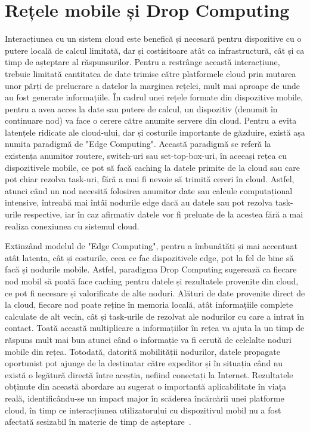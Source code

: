 \documentclass[12pt,a4paper]{report}
\begin{document}
\section{Rețele mobile și Drop Computing}
Interacțiunea cu un sistem cloud este benefică și necesară pentru dispozitive cu o putere locală de calcul limitată, dar și costisitoare atât ca infrastructură, cât și ca timp de așteptare al răspunsurilor. Pentru a restrânge această interacțiune, trebuie limitată cantitatea de date trimise către platformele cloud prin mutarea unor părți de prelucrare a datelor la marginea rețelei, mult mai aproape de unde au fost generate informațiile. În cadrul unei rețele formate din dispozitive mobile, pentru a avea acces la date sau putere de calcul, un dispozitiv (denumit în continuare nod) va face o cerere către anumite servere din cloud. Pentru a evita latențele ridicate ale cloud-ului, dar și costurile importante de găzduire, există așa numita paradigmă de "Edge Computing". Această paradigmă se referă la existența anumitor routere, switch-uri sau set-top-box-uri, în aceeași rețea cu dispozitivele mobile, ce pot să facă caching la datele primite de la cloud sau care pot chiar rezolva task-uri, fără a mai fi nevoie să trimită cereri în cloud. Astfel, atunci când un nod necesită folosirea anumitor date sau calcule computațional intensive, întreabă mai întâi nodurile edge dacă au datele sau pot rezolva task-urile respective, iar în caz afirmativ datele vor fi preluate de la acestea fără a mai realiza conexiunea cu sistemul cloud.

Extinzând modelul de "Edge Computing", pentru a îmbunătăți și mai accentuat atât latența, cât și costurile, ceea ce fac dispozitivele edge, pot la fel de bine să facă și nodurile mobile. Astfel, paradigma Drop Computing sugerează ca fiecare nod mobil să poată face caching pentru datele și rezultatele provenite din cloud, ce pot fi necesare și valorificate de alte noduri. Alături de date provenite direct de la cloud, fiecare nod poate reține în memoria locală, atât informațiile complete calculate de alt vecin, cât și task-urile de rezolvat ale nodurilor cu care a intrat în contact. Toată această multiplicare a informațiilor în rețea va ajuta la un timp de răspuns mult mai bun atunci când o informație va fi cerută de celelalte noduri mobile din rețea. Totodată, datorită mobilității nodurilor, datele propagate oportunist pot ajunge de la destinatar către expeditor și în situația când nu există o legătură directă între aceștia, nefiind conectați la Internet. Rezultatele obținute din această abordare au sugerat o importantă aplicabilitate în viața reală, identificându-se un impact major în scăderea încărcării unei platforme cloud, în timp ce interacțiunea utilizatorului cu dispozitivul mobil nu a fost afectată sesizabil în materie de timp de așteptare~\cite{DC}.
\end{document}
